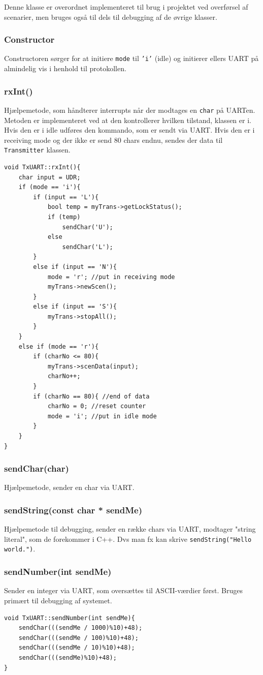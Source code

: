 Denne klasse er overordnet implementeret til brug i projektet ved overførsel af scenarier, men bruges også til dels til debugging af de øvrige klasser.

\subsubsection{Constructor}

Constructoren sørger for at initiere \texttt{mode} til \texttt{'i'} (idle) og initierer ellers UART på almindelig vis i henhold til protokollen.

\subsubsection{rxInt()}

Hjælpemetode, som håndterer interrupts når der modtages en \texttt{char} på UARTen. Metoden er implementeret ved at den kontrollerer hvilken tilstand, klassen er i. Hvis den er i idle udføres den kommando, som er sendt via UART. Hvis den er i receiving mode og der ikke er send 80 chars endnu, sendes der data til \texttt{Transmitter} klassen.

\begin{lstlisting}
void TxUART::rxInt(){
	char input = UDR;
	if (mode == 'i'){
		if (input == 'L'){
			bool temp = myTrans->getLockStatus();
			if (temp)
				sendChar('U');
			else
    			sendChar('L');
		}
		else if (input == 'N'){
			mode = 'r'; //put in receiving mode
			myTrans->newScen();
		}
		else if (input == 'S'){
			myTrans->stopAll();
		}
	}
	else if (mode == 'r'){
		if (charNo <= 80){
			myTrans->scenData(input);
			charNo++;
		}
		if (charNo == 80){ //end of data
			charNo = 0; //reset counter
			mode = 'i'; //put in idle mode
		}
	}
}
\end{lstlisting}

\subsubsection{sendChar(char)}

Hjælpemetode, sender en char via UART.

\subsubsection{sendString(const char * sendMe)}
Hjælpemetode til debugging, sender en række chars via UART, modtager "string literal", som de forekommer i C++. Dvs man fx kan skrive \texttt{sendString("Hello world.")}.

\subsubsection{sendNumber(int sendMe)}
Sender en integer via UART, som oversættes til ASCII-værdier først. Bruges primært til debugging af systemet.
\begin{lstlisting}
void TxUART::sendNumber(int sendMe){
	sendChar(((sendMe / 1000)%10)+48);
	sendChar(((sendMe / 100)%10)+48);
	sendChar(((sendMe / 10)%10)+48);
	sendChar(((sendMe)%10)+48);
}
\end{lstlisting}